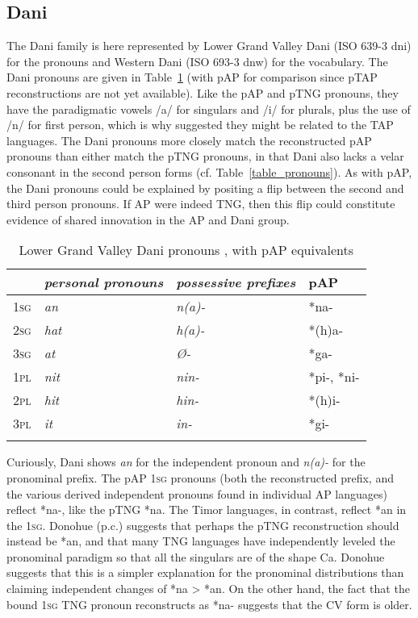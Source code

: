 \subsection{Dani}
The Dani family is here represented by Lower Grand Valley Dani (ISO 639-3 dni) for the pronouns and Western Dani (ISO 693-3 dnw) for the vocabulary. The Dani pronouns are given in Table~\ref{tab:4:dani_pronouns} (with pAP for comparison since pTAP reconstructions are not yet available). Like the pAP and pTNG pronouns, they have the paradigmatic vowels /a/ for singulars and /i/ for plurals, plus the use of /n/ for first person, which is why \citet{Ross2005} suggested they might be related to the TAP languages. The Dani pronouns more closely match the reconstructed pAP pronouns than either match the pTNG pronouns, in that Dani also lacks a velar consonant in the second person forms (cf. Table~\ref{table_pronouns}). As with pAP, the Dani pronouns could be explained by positing a flip between the second and third person pronouns. If AP were indeed TNG, then this flip could constitute evidence of shared innovation in the AP and Dani group.


\begin{table}[h]

\begin{tabularx}{\textwidth}{X>{\it}l>{\it}lX}
\lsptoprule
 & \rm personal pronouns & \rm possessive prefixes & \rm pAP \\ 
 \midrule
\textsc{1sg}& an & n(a)- & *na- \\ 
\textsc{2sg}& hat & h(a)- & *(h)a- \\ 
\textsc{3sg}& at & {\O}- & *ga- \\ 
\textsc{1pl}& nit & nin- & *pi-, *ni- \\ 
\textsc{2pl}& hit & hin- & *(h)i- \\ 
\textsc{3pl}& it & in- & *gi- \\ 
\lspbottomrule
\end{tabularx} 
\caption{Lower Grand Valley Dani pronouns \citep[145-6]{VanDerStap1966}, with pAP equivalents}
\label{tab:4:dani_pronouns}
\end{table}


Curiously, Dani shows \textit{an} for the independent pronoun and \textit{n(a)-} for the pro\-nom\-i\-nal prefix. The pAP \textsc{1sg} pronouns (both the reconstructed prefix, and the various derived independent pronouns found in individual AP languages) reflect *na-, like the pTNG *na. The Timor languages, in contrast, reflect *an in the \textsc{1sg}. Donohue (p.c.) suggests that perhaps the pTNG reconstruction should instead be *an, and that many TNG languages have independently leveled the pronominal paradigm so that all the singulars are of the shape Ca. Donohue suggests that this is a simpler explanation for the pronominal distributions than claiming independent changes of *na {\textgreater} *an. On the other hand, the fact that the bound \textsc{1sg} TNG pronoun reconstructs as *na- suggests that the CV form is older.

